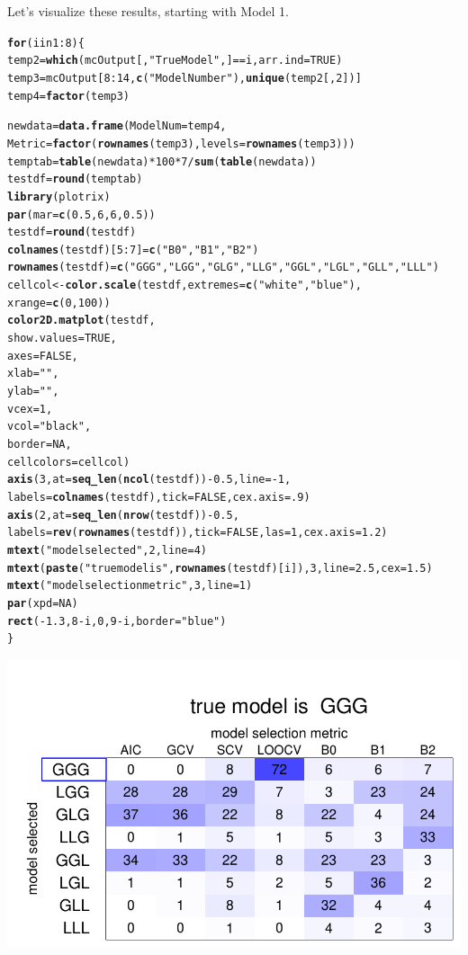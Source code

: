 \documentclass{article}\usepackage[]{graphicx}\usepackage[]{color}
\makeatletter
\def\maxwidth{ %
  \ifdim\Gin@nat@width>\linewidth
    \linewidth
  \else
    \Gin@nat@width
  \fi
}
\newcommand{\hlstr}[1]{\textcolor[rgb]{0.192,0.494,0.8}{#1}}%
\newcommand{\hlkwd}[1]{\textcolor[rgb]{0.737,0.353,0.396}{\textbf{#1}}}%
\newenvironment{kframe}{%
 \def\at@end@of@kframe{}%
 \ifinner\ifhmode%
  \def\at@end@of@kframe{\end{minipage}}%
  \begin{minipage}{\columnwidth}%
 \fi\fi%
 \def\FrameCommand##1{\hskip\@totalleftmargin \hskip-\fboxsep
 \colorbox{shadecolor}{##1}\hskip-\fboxsep
     \hskip-\linewidth \hskip-\@totalleftmargin \hskip\columnwidth}%
 \MakeFramed {\advance\hsize-\width
   \@totalleftmargin\z@ \linewidth\hsize
   \@setminipage}}%
 {\par\unskip\endMakeFramed%
 \at@end@of@kframe}
\newenvironment{knitrout}{}{} %
\makeatother
\begin{document}
Let's visualize these results, starting with Model 1.
\begin{knitrout}
\color{fgcolor}\begin{kframe}
\begin{alltt}
\hlkwd{for} (i in 1:8) \{
  temp2 = \hlkwd{which}(mcOutput[,\hlstr{"True Model"} ,] == i, arr.ind = TRUE)
  temp3 = mcOutput[8:14, \hlkwd{c}(\hlstr{"Model Number"}), \hlkwd{unique}(temp2[, 2])]
  temp4 = \hlkwd{factor}(temp3)
  
  newdata = \hlkwd{data.frame}(ModelNum = temp4, 
                       Metric = \hlkwd{factor}(\hlkwd{rownames}(temp3), levels = \hlkwd{rownames}(temp3)))
  temptab = \hlkwd{table}(newdata)*100*7/\hlkwd{sum}(\hlkwd{table}(newdata))
testdf = \hlkwd{round}(temptab)
\hlkwd{library}(plotrix)
\hlkwd{par}(mar = \hlkwd{c}(0.5, 6, 6, 0.5))
testdf = \hlkwd{round}(testdf)
\hlkwd{colnames}(testdf)[5:7] = \hlkwd{c}(\hlstr{"B0"}, \hlstr{"B1"}, \hlstr{"B2"})
\hlkwd{rownames}(testdf) = \hlkwd{c}(\hlstr{"GGG"}, \hlstr{"LGG"}, \hlstr{"GLG"}, \hlstr{"LLG"}, \hlstr{"GGL"}, \hlstr{"LGL"}, \hlstr{"GLL"}, \hlstr{"LLL"})
cellcol<-\hlkwd{color.scale}(testdf, extremes = \hlkwd{c}(\hlstr{"white"}, \hlstr{"blue"}),
                     xrange = \hlkwd{c}(0, 100))
\hlkwd{color2D.matplot}(testdf, 
                show.values = TRUE,
                axes = FALSE,
                xlab = \hlstr{""},
                ylab = \hlstr{""},
                vcex = 1,
                vcol = \hlstr{"black"},
                border = NA,
                cellcolors = cellcol)
  \hlkwd{axis}(3, at = \hlkwd{seq_len}(\hlkwd{ncol}(testdf)) - 0.5, line = -1,
     labels = \hlkwd{colnames}(testdf), tick = FALSE, cex.axis = .9)
  \hlkwd{axis}(2, at = \hlkwd{seq_len}(\hlkwd{nrow}(testdf)) -0.5,
     labels = \hlkwd{rev}(\hlkwd{rownames}(testdf)), tick = FALSE, las = 1, cex.axis = 1.2)
  \hlkwd{mtext}(\hlstr{"model selected"}, 2, line = 4)
  \hlkwd{mtext}(\hlkwd{paste}(\hlstr{"true model is "}, \hlkwd{rownames}(testdf)[i]), 3, line = 2.5, cex = 1.5)
  \hlkwd{mtext}(\hlstr{"model selection metric"}, 3, line = 1)
  \hlkwd{par}(xpd = NA)
  \hlkwd{rect}(-1.3, 8-i, 0, 9-i, border = \hlstr{"blue"})
\}
\end{alltt}
\end{kframe}
\includegraphics[width=\maxwidth]{figure/ModelSelectionTabulations11} 


\end{knitrout}
\end{document}

